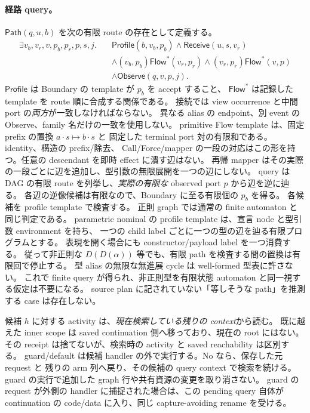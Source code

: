 \documentclass[11pt,a4paper]{article}
\begin{document}
\paragraph{経路 query。}
\(\mathsf{Path}(q,u,b)\) を次の有限 route の存在として定義する。
\[
\begin{split}
\exists v_b,v_r,v,p_b,p_r,p,s,j.\quad&
 \mathsf{Profile}(b,v_b,p_b)\land\mathsf{Receive}(u,s,v_r)\\
 &\land (v_b,p_b)\mathrel{\mathsf{Flow}^*}(v_r,p_r)
 \land (v_r,p_r)\mathrel{\mathsf{Flow}^*}(v,p)\\
 &\land\mathsf{Observe}(q,v,p,j).
\end{split}
\]
\(\mathsf{Profile}\) は Boundary の template が \(p_b\) を accept すること、
\(\mathsf{Flow}^*\) は記録した template を route 順に合成する関係である。
接続では view occurrence と中間 port の\emph{両方}が一致しなければならない。
異なる alias の endpoint、別 event の Observe、family 名だけの一致を使用しない。
primitive Flow template は、固定 prefix の置換 \(a\cdot s\mapsto b\cdot s\) と
固定した terminal port 対の有限和である。identity、構造の prefix/除去、
Call/Force/mapper の一段の対応はこの形を持つ。任意の descendant を即時 effect に潰す辺はない。
再帰 mapper はその実際の一段ごとに辺を追加し、型引数の無限展開を一つの辺にしない。
query は DAG の有限 route を列挙し、\emph{実際の有限な} observed port \(p\) から辺を逆に辿る。
各辺の逆像候補は有限なので、Boundary に至る有限個の \(p_b\) を得る。
各候補を profile template で検査する。
正則 graph では通常の finite automaton と同じ判定である。
parametric nominal の profile template は、宣言 node と型引数 environment を持ち、
一つの child label ごとに一つの型の辺を辿る有限プログラムとする。
表現を開く場合にも constructor/payload label を一つ消費する。
従って非正則な \(D(D(\alpha))\) 等でも、有限 path を検査する間の置換は有限回で停止する。
型 alias の無限な無進展 cycle は well-formed 型表に許さない。
これで finite query が得られ、非正則型を有限状態 automaton と同一視する仮定は不要になる。
source plan に記されていない「等しそうな path」を推測する case は存在しない。

候補 \(h\) に対する activity は、\emph{現在検索している残りの context}から読む。
既に越えた inner scope は saved continuation 側へ移っており、現在の root にはない。
その receipt は捨てないが、検索時の activity と saved reachability は区別する。
guard/default は候補 handler の外で実行する。No なら、保存した元 request と
残りの arm 列へ戻り、その候補の query context で検索を続ける。
guard の実行で追加した graph 行や共有資源の変更を取り消さない。
guard の request が外側の handler に捕捉された場合は、この pending query 自体が
continuation の code/data に入り、同じ capture-avoiding rename を受ける。
\end{document}
